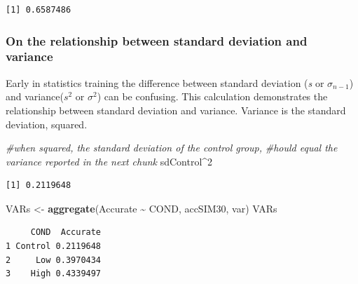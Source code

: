 \documentclass[
  11pt,
]{book}
\newenvironment{Shaded}{\begin{snugshade}}{\end{snugshade}}
\newcommand{\CommentTok}[1]{\textcolor[rgb]{0.37,0.37,0.37}{\textit{#1}}}
\newcommand{\DecValTok}[1]{\textcolor[rgb]{0.06,0.06,0.06}{#1}}
\newcommand{\FunctionTok}[1]{\textcolor[rgb]{0.27,0.27,0.27}{\textbf{#1}}}
\newcommand{\NormalTok}[1]{#1}
\newcommand{\OtherTok}[1]{\textcolor[rgb]{0.37,0.37,0.37}{#1}}
\newcommand{\SpecialCharTok}[1]{\textcolor[rgb]{0.43,0.43,0.43}{\textbf{#1}}}
\begin{document}
\begin{Shaded}
\end{Shaded}

\begin{verbatim}
[1] 0.6587486
\end{verbatim}

\hypertarget{on-the-relationship-between-standard-deviation-and-variance}{%
\subsubsection{On the relationship between standard deviation and variance}\label{on-the-relationship-between-standard-deviation-and-variance}}

Early in statistics training the difference between standard deviation (\emph{s} or \(\sigma_{n-1}\)) and variance(\(s^{2}\) or \(\sigma^{2}\)) can be confusing. This calculation demonstrates the relationship between standard deviation and variance. Variance is the standard deviation, squared.

\begin{Shaded}
\begin{Highlighting}[]
\CommentTok{\#when squared, the standard deviation of the control group, }
\CommentTok{\#hould equal the variance reported in the next chunk}
\NormalTok{sdControl}\SpecialCharTok{\^{}}\DecValTok{2}
\end{Highlighting}
\end{Shaded}

\begin{verbatim}
[1] 0.2119648
\end{verbatim}

\begin{Shaded}
\begin{Highlighting}[]
\NormalTok{VARs }\OtherTok{\textless{}{-}} \FunctionTok{aggregate}\NormalTok{(Accurate }\SpecialCharTok{\textasciitilde{}}\NormalTok{ COND, accSIM30, var)}
\NormalTok{VARs}
\end{Highlighting}
\end{Shaded}

\begin{verbatim}
     COND  Accurate
1 Control 0.2119648
2     Low 0.3970434
3    High 0.4339497
\end{verbatim}
\end{document}

